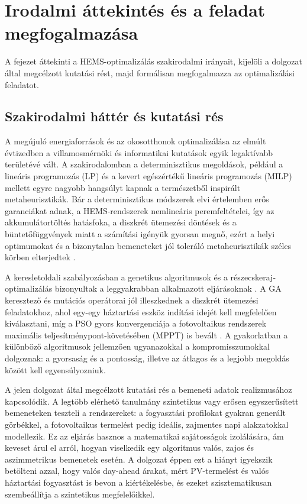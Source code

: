 \chapter{Irodalmi áttekintés és a feladat megfogalmazása}\label{ch:ALAPOK}

\begin{osszefoglal}
A fejezet áttekinti a HEMS-optimalizálás szakirodalmi irányait, kijelöli a dolgozat által megcélzott kutatási rést, majd formálisan megfogalmazza az optimalizálási feladatot.
\end{osszefoglal}

\section{Szakirodalmi háttér és kutatási rés}
A megújuló energiaforrások és az okosotthonok optimalizálása az elmúlt évtizedben a villamosmérnöki és informatikai kutatások egyik legaktívabb területévé vált. A szakirodalomban a determinisztikus megoldások, például a lineáris programozás (LP) és a kevert egészértékű lineáris programozás (MILP) mellett egyre nagyobb hangsúlyt kapnak a természetből inspirált metaheurisztikák. Bár a determinisztikus módszerek elvi értelemben erős garanciákat adnak, a HEMS-rendszerek nemlineáris peremfeltételei, így az akkumulátortöltés hatásfoka, a diszkrét ütemezési döntések és a büntetőfüggvények miatt a számítási igényük gyorsan megnő, ezért a helyi optimumokat és a bizonytalan bemeneteket jól toleráló metaheurisztikák széles körben elterjedtek \cite{Ismail2014, Fadaee2012}.

A keresletoldali szabályozásban a genetikus algoritmusok \cite{HollandGA1975} és a részecskeraj-optimalizálás bizonyultak a leggyakrabban alkalmazott eljárásoknak \cite{Fadaee2012, KennedyEberhartPSO1995}. A GA keresztező és mutációs operátorai jól illeszkednek a diszkrét ütemezési feladatokhoz, ahol egy-egy háztartási eszköz indítási idejét kell megfelelően kiválasztani, míg a PSO gyors konvergenciája a fotovoltaikus rendszerek maximális teljesítménypont-követésében (MPPT) is bevált \cite{KumarGA}. A gyakorlatban a különböző algoritmusok jellemzően ugyanazokkal a kompromisszumokkal dolgoznak: a gyorsaság és a pontosság, illetve az átlagos és a legjobb megoldás között kell egyensúlyozniuk.

A jelen dolgozat által megcélzott kutatási rés a bemeneti adatok realizmusához kapcsolódik. A legtöbb elérhető tanulmány szintetikus vagy erősen egyszerűsített bemeneteken teszteli a rendszereket: a fogyasztási profilokat gyakran generált görbékkel, a fotovoltaikus termelést pedig ideális, zajmentes napi alakzatokkal modellezik. Ez az eljárás hasznos a matematikai sajátosságok izolálására, ám keveset árul el arról, hogyan viselkedik egy algoritmus valós, zajos és aszimmetrikus bemenetek esetén. A dolgozat éppen ezt a hiányt igyekszik betölteni azzal, hogy valós day-ahead árakat, mért PV-termelést és valós háztartási fogyasztást is bevon a kiértékelésbe, és ezeket szisztematikusan szembeállítja a szintetikus megfelelőikkel.

